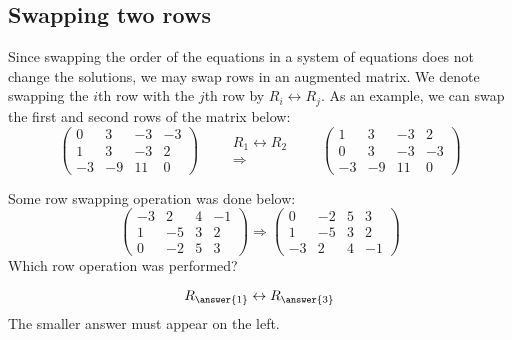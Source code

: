 \documentclass{ximera}
\begin{document}
\subsection{Swapping two rows} Since swapping the order of the equations in a
  system of equations does not change the solutions, we may swap rows
  in an augmented matrix. We denote swapping the $i$th row with the
  $j$th row by $R_i\leftrightarrow R_j$. As an example, we can swap
  the first and second rows of the matrix below:
 \[
\left(\begin{array}{ccc|c}
  0 &   3 & -3 & -3 \\
  1 &   3 & -3 & 2  \\
  -3& -9  & 11 & 0
\end{array}\right)
\qquad
\begin{array}{c}
  \scriptstyle R_1\leftrightarrow R_2\\\Longrightarrow
\end{array}
\qquad
\left(\begin{array}{ccc|c}
  1 &   3 & -3 & 2  \\
  0 &   3 & -3 & -3 \\
  -3& -9  & 11 & 0
\end{array}\right)
\]

\begin{question}
  Some row swapping operation was done below:
  \[
  \begin{pmatrix}
-3 & 2 & 4 & -1 \\
1 & -5 & 3 & 2 \\
0 & -2 & 5 & 3
  \end{pmatrix}
  \Rightarrow
  \begin{pmatrix}
0 & -2 & 5 & 3 \\
1 & -5 & 3 & 2 \\
-3 & 2 & 4 & -1
\end{pmatrix}
  \]
  Which row operation was performed?
  \begin{prompt}
    \[
    R_{\answer{1}} \leftrightarrow R_{\answer{3}}
    \]
    The smaller answer must appear on the left.
  \end{prompt}
\end{question}
\end{document}
